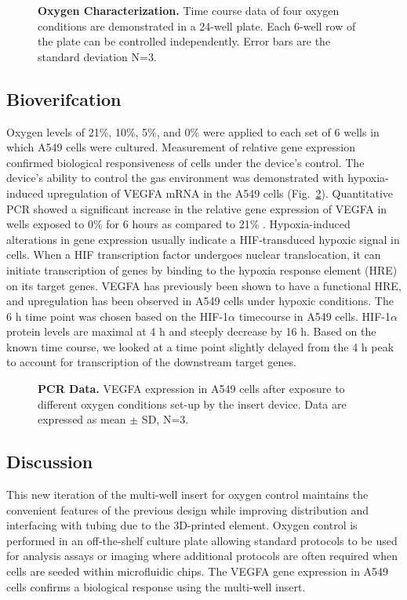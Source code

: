 \documentclass[10pt,letterpaper]{article}
\begin{document}
\begin{figure}[h]
\caption{
{\bf Oxygen Characterization.} 
Time course data of four oxygen conditions are demonstrated in a 24-well plate.
Each 6-well row of the plate can be controlled independently.  
Error bars are the standard deviation N=3.
}
\label{fig2}
\end{figure}

\subsection*{Bioverifcation}

Oxygen levels of 21\%, 10\%, 5\%, and 0\% were applied to each set of 6 wells in which A549 cells were cultured.
Measurement of relative gene expression confirmed biological responsiveness of cells under the device’s control.
The device’s ability to control the gas environment was demonstrated with hypoxia-induced upregulation of VEGFA mRNA in the A549 cells (Fig.~\ref{fig3}).  Quantitative PCR showed a significant increase in the relative gene expression of VEGFA in wells exposed to 0\%  for 6 hours as compared to 21\% . Hypoxia-induced alterations in gene expression usually indicate a HIF-transduced hypoxic signal in cells.
When a HIF transcription factor undergoes nuclear translocation, it can initiate transcription of genes by binding to the hypoxia response element (HRE)\cite{Lee2004} on its target genes.
VEGFA has previously been shown to have a functional HRE, and upregulation has been observed in A549 cells under hypoxic conditions\cite{RohrerBley2011}.
The 6 h time point was chosen based on the HIF-1$\alpha$ timecourse in A549 cells. 
HIF-1$\alpha$ protein levels are maximal at 4 h and steeply decrease by 16 h\cite{Li2006}. 
Based on the known time course, we looked at a time point slightly delayed from the 4 h peak to account for transcription of the downstream target genes.
\begin{figure}[h]
\caption{
{\bf PCR Data.}  VEGFA expression in A549 cells after exposure to different oxygen conditions set-up by the insert device. Data are expressed as mean $\pm$ SD, N=3.
}
\label{fig3}
\end{figure}

\subsection*{Discussion}
This new iteration of the multi-well insert for oxygen control maintains the convenient features of the previous design while improving distribution and interfacing with tubing due to the 3D-printed element.
Oxygen control is performed in an off-the-shelf culture plate allowing standard protocols to be used for analysis assays or imaging where additional protocols are often required when cells are seeded within microfluidic chips.
The VEGFA gene expression in A549 cells confirms a biological response using the multi-well insert.
\end{document}
